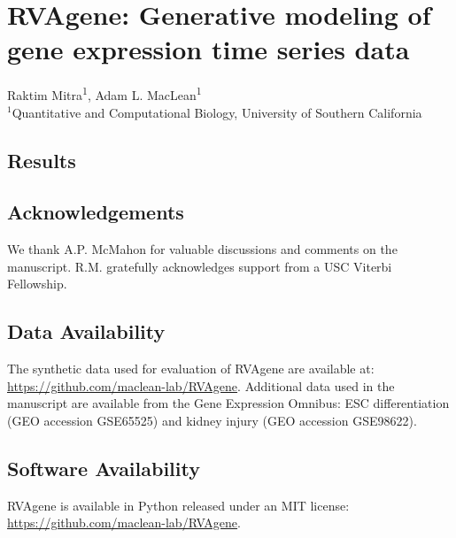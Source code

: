 \documentclass[letterpaper,11pt]{report}
\begin{document}
\chapter{RVAgene: Generative modeling of gene expression time series data}
\label{cha:research_topic_1}

\vspace*{0.35in}

\begin{flushleft}
{\large Raktim Mitra\textsuperscript{1},
Adam L. MacLean\textsuperscript{1}}\\

\bigskip
$^1$Quantitative and Computational Biology, University of Southern California
\\

\end{flushleft}






\section{Results}








\section*{Acknowledgements}
We thank A.P. McMahon for valuable discussions and comments on the manuscript.
R.M. gratefully acknowledges support from a USC Viterbi Fellowship.

\section*{Data Availability}
The synthetic data used for evaluation of RVAgene are available at:
\url{https://github.com/maclean-lab/RVAgene}. Additional data used in the manuscript are available from the Gene Expression Omnibus: ESC differentiation (GEO accession GSE65525) and kidney injury (GEO accession GSE98622).

\section*{Software Availability}
RVAgene is available in Python released under an MIT license:  \url{https://github.com/maclean-lab/RVAgene}.
\end{document}
